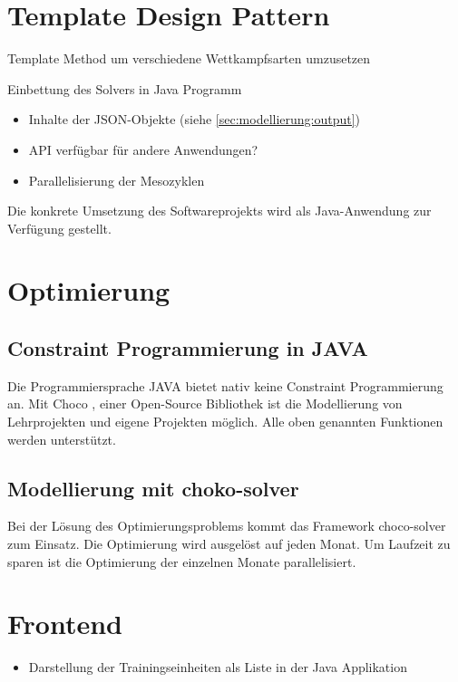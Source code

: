 \section{Template Design Pattern}
\label{sec:design:template}
Template Method um verschiedene Wettkampfsarten umzusetzen


Einbettung des Solvers in Java Programm
\begin{itemize}
    \item Inhalte der JSON-Objekte (siehe \ref{sec:modellierung:output})
    \item API verfügbar für andere Anwendungen?
    \item Parallelisierung der Mesozyklen
\end{itemize}

Die konkrete Umsetzung des Softwareprojekts wird als Java-Anwendung zur Verfügung gestellt. 

\section{Optimierung}
\subsection{Constraint Programmierung in JAVA}
Die Programmiersprache JAVA\cite{java} bietet nativ keine Constraint Programmierung an. Mit Choco \cite{ChocoSolverWeb}, einer Open-Source Bibliothek ist die Modellierung von Lehrprojekten und eigene Projekten möglich. Alle oben genannten Funktionen werden unterstützt.
\subsection{Modellierung mit choko-solver}
Bei der Lösung des Optimierungsproblems kommt das Framework choco-solver zum Einsatz. Die Optimierung wird ausgelöst auf jeden Monat. Um Laufzeit zu sparen ist die Optimierung der einzelnen Monate parallelisiert.

\section{Frontend}

\begin{itemize}
    \item Darstellung der Trainingseinheiten als Liste in der Java Applikation
\end{itemize}

